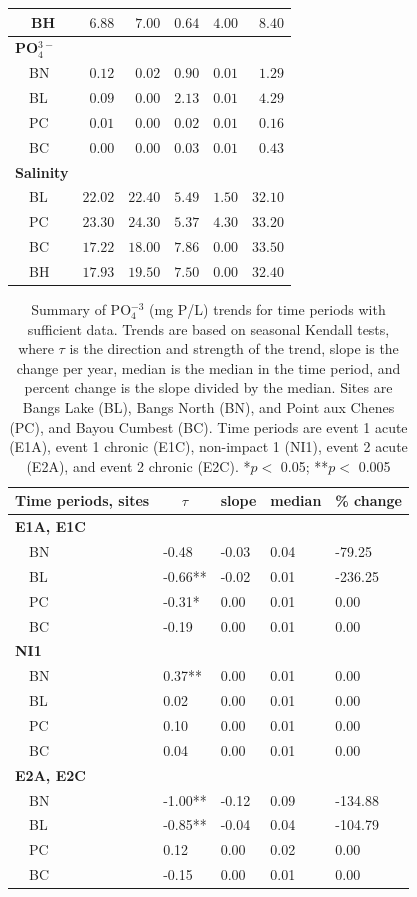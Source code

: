 \documentclass[letterpaper,12pt]{article}\usepackage[]{graphicx}\usepackage[]{color}
\begin{document}
\begin{table}[!tbp]
\begin{center}
\begin{tabular}{lrrrrr}
~~BH&$ 6.88$&$ 7.00$&$ 0.64$&$4.00$&$  8.40$\tabularnewline
\hline
{\bfseries PO$_4^{3-}$}&&&&&\tabularnewline
~~BN&$ 0.12$&$ 0.02$&$ 0.90$&$0.01$&$  1.29$\tabularnewline
~~BL&$ 0.09$&$ 0.00$&$ 2.13$&$0.01$&$  4.29$\tabularnewline
~~PC&$ 0.01$&$ 0.00$&$ 0.02$&$0.01$&$  0.16$\tabularnewline
~~BC&$ 0.00$&$ 0.00$&$ 0.03$&$0.01$&$  0.43$\tabularnewline
\hline
{\bfseries Salinity}&&&&&\tabularnewline
~~BL&$22.02$&$22.40$&$ 5.49$&$1.50$&$ 32.10$\tabularnewline
~~PC&$23.30$&$24.30$&$ 5.37$&$4.30$&$ 33.20$\tabularnewline
~~BC&$17.22$&$18.00$&$ 7.86$&$0.00$&$ 33.50$\tabularnewline
~~BH&$17.93$&$19.50$&$ 7.50$&$0.00$&$ 32.40$\tabularnewline
\hline
\end{tabular}\end{center}
\end{table}


\clearpage
\begin{table}[!tbp]
\caption{Summary of PO$_4^{-3}$ (mg P/L) trends for time periods with sufficient data.  Trends are based on seasonal Kendall tests, where $\tau$ is the direction and strength of the trend, slope is the change per year, median is the median in the time period, and percent change is the slope divided by the median.  Sites are Bangs Lake (BL), Bangs North (BN), and Point aux Chenes (PC), and Bayou Cumbest (BC). Time periods are event 1 acute (E1A), event 1 chronic (E1C), non-impact 1 (NI1), event 2 acute (E2A), and event 2 chronic (E2C). *$p <$ 0.05; **$p <$ 0.005\label{tab:PO4Ftrnd}} 
\begin{center}
\begin{tabular}{lllll}
\hline\hline
\multicolumn{1}{l}{Time periods, sites}&\multicolumn{1}{c}{$\tau$}&\multicolumn{1}{c}{slope}&\multicolumn{1}{c}{median}&\multicolumn{1}{c}{\% change}\tabularnewline
\hline
{\bfseries E1A, E1C}&&&&\tabularnewline
~~BN&-0.48&-0.03&0.04&-79.25\tabularnewline
~~BL&-0.66**&-0.02&0.01&-236.25\tabularnewline
~~PC&-0.31*&0.00&0.01&0.00\tabularnewline
~~BC&-0.19&0.00&0.01&0.00\tabularnewline
\hline
{\bfseries NI1}&&&&\tabularnewline
~~BN&0.37**&0.00&0.01&0.00\tabularnewline
~~BL&0.02&0.00&0.01&0.00\tabularnewline
~~PC&0.10&0.00&0.01&0.00\tabularnewline
~~BC&0.04&0.00&0.01&0.00\tabularnewline
\hline
{\bfseries E2A, E2C}&&&&\tabularnewline
~~BN&-1.00**&-0.12&0.09&-134.88\tabularnewline
~~BL&-0.85**&-0.04&0.04&-104.79\tabularnewline
~~PC&0.12&0.00&0.02&0.00\tabularnewline
~~BC&-0.15&0.00&0.01&0.00\tabularnewline
\hline
\end{tabular}\end{center}
\end{table}
\end{document}
